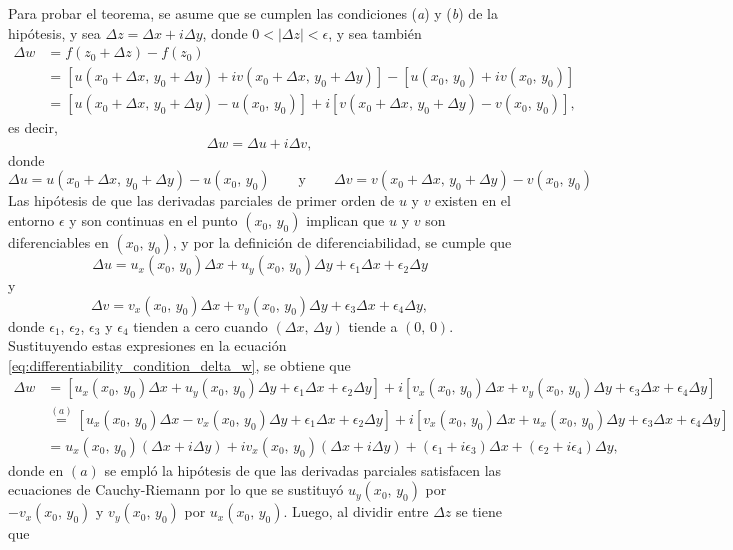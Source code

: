 \documentclass[a4paper]{report}
\begin{document}
\medskip 
Para probar el teorema, se asume que se cumplen las condiciones (\textit{a}) y (\textit{b}) de la hipótesis, y sea \(\Delta z=\Delta x+i\Delta y\), donde \(0<|\Delta z|<\epsilon\), y sea también
\begin{align*}
 \Delta w&=f(z_0+\Delta z)-f(z_0)\\
  &=[u(x_0+\Delta x,\,y_0+\Delta y)+iv(x_0+\Delta x,\,y_0+\Delta y)]-[u(x_0,\,y_0)+iv(x_0,\,y_0)]\\
  &=[u(x_0+\Delta x,\,y_0+\Delta y)-u(x_0,\,y_0)]+i[v(x_0+\Delta x,\,y_0+\Delta y)-v(x_0,\,y_0)],
\end{align*}
es decir,
\begin{equation}\label{eq:differentiability_condition_delta_w}
 \Delta w=\Delta u+i\Delta v,
\end{equation}
donde 
\[
 \Delta u=u(x_0+\Delta x,\,y_0+\Delta y)-u(x_0,\,y_0)
 \qquad\textrm{y}\qquad
 \Delta v=v(x_0+\Delta x,\,y_0+\Delta y)-v(x_0,\,y_0)
\]
Las hipótesis de que las derivadas parciales de primer orden de \(u\) y \(v\) existen en el entorno \(\epsilon\) y son continuas en el punto \((x_0,\,y_0)\) implican que \(u\) y \(v\) son diferenciables en \((x_0,\,y_0)\), y por la definición de diferenciabilidad, se cumple que 
\[
 \Delta u=u_x(x_0,\,y_0)\Delta x+u_y(x_0,\,y_0)\Delta y+\epsilon_1\Delta x+\epsilon_2\Delta y
\]
y
\[
 \Delta v=v_x(x_0,\,y_0)\Delta x+v_y(x_0,\,y_0)\Delta y+\epsilon_3\Delta x+\epsilon_4\Delta y,
\]
donde \(\epsilon_1\), \(\epsilon_2\), \(\epsilon_3\) y \(\epsilon_4\) tienden a cero cuando \((\Delta x,\,\Delta y)\) tiende a \((0,\,0)\). Sustituyendo estas expresiones en la ecuación \ref{eq:differentiability_condition_delta_w}, se obtiene que 
\begin{align*}
 \Delta w&=[u_x(x_0,\,y_0)\Delta x+u_y(x_0,\,y_0)\Delta y+\epsilon_1\Delta x+\epsilon_2\Delta y]
   +i[v_x(x_0,\,y_0)\Delta x+v_y(x_0,\,y_0)\Delta y+\epsilon_3\Delta x+\epsilon_4\Delta y]\\
   &\overset{(a)}{=}[u_x(x_0,\,y_0)\Delta x-v_x(x_0,\,y_0)\Delta y+\epsilon_1\Delta x+\epsilon_2\Delta y]
   +i[v_x(x_0,\,y_0)\Delta x+u_x(x_0,\,y_0)\Delta y+\epsilon_3\Delta x+\epsilon_4\Delta y]\\
   &=u_x(x_0,\,y_0)(\Delta x+i\Delta y)+iv_x(x_0,\,y_0)(\Delta x+i\Delta y)+(\epsilon_1+i\epsilon_3)\Delta x+(\epsilon_2+i\epsilon_4)\Delta y,
\end{align*}
donde en \((a)\) se empló la hipótesis de que las derivadas parciales satisfacen las ecuaciones de Cauchy-Riemann por lo que se sustituyó \(u_y(x_0,\,y_0)\) por \(-v_x(x_0,\,y_0)\) y \(v_y(x_0,\,y_0)\) por \(u_x(x_0,\,y_0)\). Luego, al dividir entre \(\Delta z\) se tiene que 
\end{document}
